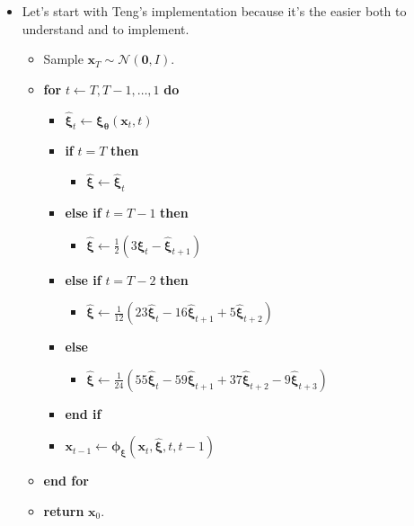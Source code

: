 \documentclass[10pt]{article}
\newcommand{\ve}[1]{\mathbf{#1}}
\newcommand{\ves}[1]{\boldsymbol{#1}}
\newcommand{\mcal}[1]{\mathcal{#1}}
\begin{document}
\begin{itemize}
  \item Let's start with Teng's implementation because it's the easier both to understand and to implement.
  \begin{itemize}
    \item[] Sample $\ve{x}_T \sim \mcal{N}(\ve{0},I)$.
    \item[] {\bf for} $t \leftarrow T, T-1, \dotsc, 1$ {\bf do}
    \begin{itemize}
      \item[] $\widehat{\ves{\xi}}_t \leftarrow \ves{\xi}_{\ves{\theta}}(\ve{x}_t, t)$
      \item[] {\bf if} $t = T$ {\bf then}
      \begin{itemize}
        \item[] $\widehat{\ves{\xi}} \leftarrow \widehat{\ves{\xi}}_t$
      \end{itemize}
      \item[] {\bf else if} $t = T-1$ {\bf then}
      \begin{itemize}
        \item[] $\widehat{\ves{\xi}} \leftarrow \frac{1}{2} (3\widehat{\ves{\xi}}_t - \widehat{\ves{\xi}}_{t+1})$
      \end{itemize}
      \item[] {\bf else if} $t = T-2$ {\bf then}
      \begin{itemize}
        \item[] $\widehat{\ves{\xi}} \leftarrow \frac{1}{12} (23\widehat{\ves{\xi}}_t - 16\widehat{\ves{\xi}}_{t+1} + 5\widehat{\ves{\xi}}_{t+2})$
      \end{itemize}
      \item[] {\bf else}
      \begin{itemize}
        \item[] $\widehat{\ves{\xi}} \leftarrow \frac{1}{24} (55\widehat{\ves{\xi}}_t - 59\widehat{\ves{\xi}}_{t+1} + 37\widehat{\ves{\xi}}_{t+2} -9\widehat{\ves{\xi}}_{t+3})$
      \end{itemize}
      \item[] {\bf end if}
      \item[] $\ve{x}_{t-1} \leftarrow \ves{\phi}_{\ves{\xi}}(\ve{x}_t, \widehat{\ves{\xi}}, t, t-1)$
    \end{itemize}
    \item[] {\bf end for}
    \item[] {\bf return} $\ve{x}_0$.
  \end{itemize}


\end{itemize}
\end{document}
